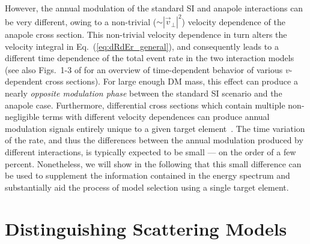 \documentclass[11pt]{article}
\newcommand{\Eq}[1]{Eq.~(\ref{#1})} \newcommand{\Eqs}[2]{Eqs.~(\ref{#1}) and (\ref{#2})} \newcommand{\Eqm}[2]{Eqs.~(\ref{#1}) through (\ref{#2})}
\newcommand{\sjwColor}{red}
\newcommand{\sjw}[1]{{\color{\sjwColor} #1}}
\begin{document}
However, the annual modulation of the standard SI and anapole interactions can be very different, owing to a non-trivial ($\sim | \vec v_\perp|^2$) velocity dependence of the anapole cross section. This \sjw{non-trivial velocity dependence} in turn alters the velocity integral in \Eq{eq:dRdEr_general}, and consequently leads to a different time dependence of the total event rate in the two interaction models (see also Figs.~1-3 of \cite{DelNobile:2015rmp} for an overview of time-dependent behavior of various $v$-dependent cross sections). For large enough DM mass, this effect can produce a nearly {\it opposite modulation phase} between the standard SI scenario and the anapole case. Furthermore, differential cross sections which contain multiple non-negligible terms with different velocity dependences can produce annual modulation signals entirely unique to a given target element~\cite{DelNobile:2015tza,DelNobile:2015rmp}. The time variation of the rate, and thus the differences between the annual modulation produced by different interactions, is typically expected to be small --- on the order of a few percent. Nonetheless, we will show in the following that this small difference can be used to supplement the information contained in the energy spectrum and substantially aid the process of model selection using a single target element. 

\section{Distinguishing Scattering Models}\label{sec:procedure}
\end{document}
